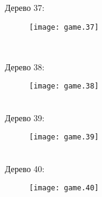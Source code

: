 \documentclass[pdftex,12pt,a4paper]{article}
\begin{document}
Дерево 37: \\
\begin{figure}[htbp]
    \texttt{[image: game.37]}
\end{figure}\\

\newpage 

Дерево 38: \\
\begin{figure}[htbp]
    \texttt{[image: game.38]}
\end{figure}\\

Дерево 39: \\
\begin{figure}[htbp]
    \texttt{[image: game.39]}
\end{figure}\\

Дерево 40: \\
\begin{figure}[htbp]
    \texttt{[image: game.40]}
\end{figure}\\
\end{document}
